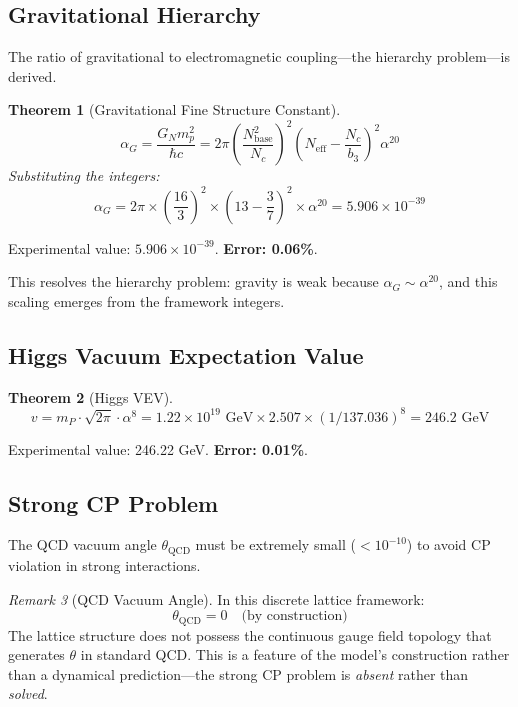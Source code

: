 \documentclass[11pt,a4paper]{article}
\newtheorem{theorem}{Theorem}[section]
\theoremstyle{definition}
\theoremstyle{remark}
\newtheorem{remark}[theorem]{Remark}
\newcommand{\Neff}{N_{\text{eff}}}
\begin{document}
\subsection{Gravitational Hierarchy}

The ratio of gravitational to electromagnetic coupling---the hierarchy problem---is derived.

\begin{theorem}[Gravitational Fine Structure Constant]
\begin{equation}
\alpha_G = \frac{G_N m_p^2}{\hbar c} = 2\pi \left(\frac{N_{\text{base}}^2}{N_c}\right)^2 \left(\Neff - \frac{N_c}{b_3}\right)^2 \alpha^{20}
\end{equation}
Substituting the integers:
\begin{equation}
\alpha_G = 2\pi \times \left(\frac{16}{3}\right)^2 \times \left(13 - \frac{3}{7}\right)^2 \times \alpha^{20} = 5.906 \times 10^{-39}
\end{equation}
\end{theorem}

Experimental value: $5.906 \times 10^{-39}$. \textbf{Error: 0.06\%}.

This resolves the hierarchy problem: gravity is weak because $\alpha_G \sim \alpha^{20}$, and this scaling emerges from the framework integers.

\subsection{Higgs Vacuum Expectation Value}

\begin{theorem}[Higgs VEV]
\begin{equation}
v = m_P \cdot \sqrt{2\pi} \cdot \alpha^8 = 1.22 \times 10^{19} \text{ GeV} \times 2.507 \times (1/137.036)^8 = 246.2 \text{ GeV}
\end{equation}
\end{theorem}

Experimental value: 246.22 GeV. \textbf{Error: 0.01\%}.

\subsection{Strong CP Problem}

The QCD vacuum angle $\theta_{\text{QCD}}$ must be extremely small ($< 10^{-10}$) to avoid CP violation in strong interactions.

\begin{remark}[QCD Vacuum Angle]
In this discrete lattice framework:
\begin{equation}
\theta_{\text{QCD}} = 0 \quad \text{(by construction)}
\end{equation}
The lattice structure does not possess the continuous gauge field topology that generates $\theta$ in standard QCD. This is a feature of the model's construction rather than a dynamical prediction---the strong CP problem is \emph{absent} rather than \emph{solved}.
\end{remark}
\end{document}

